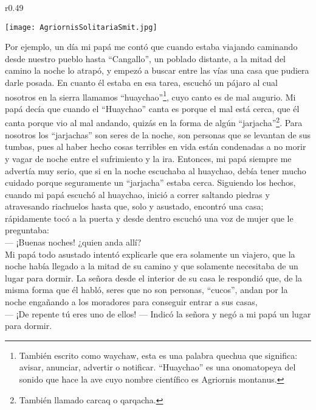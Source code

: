\ifdefined\EnableIncludeImages
\begin{wrapfigure}{r}{0.49\textwidth}
  \begin{center}
  \vspace{-20pt}
    \texttt{[image: AgriornisSolitariaSmit.jpg]}
  \end{center}
  \vspace{-20pt}
\end{wrapfigure}
\fi
Por ejemplo, un día mi papá me contó que cuando estaba viajando caminando desde nuestro pueblo hasta ``Cangallo'', un poblado distante, a la mitad del camino la noche lo atrapó, y empezó a buscar entre las vías una casa que pudiera darle posada. En cuanto él estaba en esa tarea, escuchó un pájaro al cual nosotros en la sierra llamamos ``huaychao''\footnote{También escrito como waychaw, esta es una palabra quechua que significa: avisar, anunciar, advertir o notificar. ``Huaychao'' es una onomatopeya del sonido que hace la ave cuyo nombre científico es Agriornis montanus.}, cuyo canto es de mal augurio.
Mi papá decía que cuando el ``Huaychao'' canta es porque el mal está cerca, que él canta porque vio al mal andando, quizás en la forma de algún ``jarjacha''\footnote{También llamado carcaq o qarqacha.}. Para nosotros los ``jarjachas'' son seres de la noche, son personas que se levantan de sus tumbas, pues al haber hecho cosas terribles en vida están condenadas a no morir y vagar de noche entre el sufrimiento y la ira.
Entonces, mi papá siempre me advertía muy serio, que si en la noche escuchaba al huaychao, debía tener mucho cuidado porque seguramente un ``jarjacha'' estaba cerca.
Siguiendo los hechos, cuando mi papá escuchó al huaychao, inició a correr saltando piedras y atravesando riachuelos hasta que, solo y asustado, encontró una casa; rápidamente tocó a la puerta y desde dentro escuchó una voz de mujer que le preguntaba:\\\indent
--- ¡Buenas noches! ¿quien anda allí?\\\indent
Mi papá todo asustado intentó explicarle que era solamente un viajero, que la noche había llegado a la mitad de su camino y que solamente necesitaba de un lugar para dormir. La señora desde el interior de su casa le respondió que, de la misma forma que él habló, seres que no son personas, ``cucos'', andan por la noche engañando a los moradores para conseguir entrar a sus casas,\\\indent
--- ¡De repente tú eres uno de ellos! --- Indicó la señora y negó a mi papá un lugar para dormir. \\\indent
